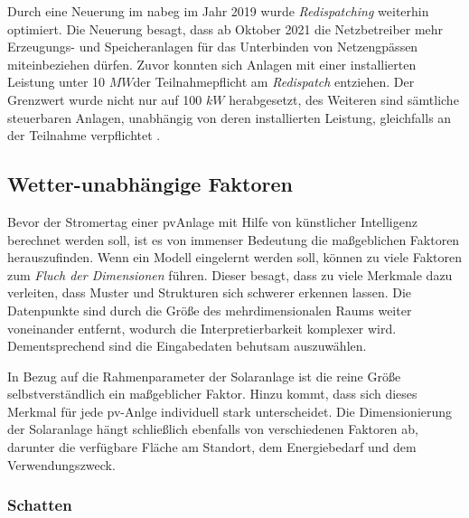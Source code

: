 \documentclass[12pt, a4paper]{article}
\begin{document}
Durch eine Neuerung im \ac{nabeg}  im Jahr 2019 wurde \textit{Redispatching} weiterhin optimiert. Die Neuerung besagt, dass ab Oktober 2021 die Netzbetreiber mehr Erzeugungs- und Speicheranlagen für das Unterbinden von Netzengpässen miteinbeziehen dürfen. Zuvor konnten sich Anlagen mit einer installierten Leistung unter 10 $MW$der Teilnahmepflicht am \textit{Redispatch} entziehen. Der Grenzwert wurde nicht nur auf 100 $kW$ herabgesetzt, des Weiteren sind sämtliche steuerbaren Anlagen, unabhängig von deren installierten Leistung, gleichfalls an der Teilnahme verpflichtet \cite{ws:bmwk}.




\subsection{Wetter-unabhängige Faktoren}

Bevor der Stromertag einer \ac{pv}Anlage mit Hilfe von künstlicher Intelligenz berechnet werden soll, ist es von immenser Bedeutung die maßgeblichen Faktoren herauszufinden. Wenn ein Modell eingelernt werden soll, können zu viele Faktoren zum \textit{Fluch der Dimensionen} führen. Dieser besagt, dass zu viele Merkmale dazu verleiten, dass Muster und Strukturen sich schwerer erkennen lassen. Die Datenpunkte sind durch die Größe des mehrdimensionalen Raums weiter voneinander entfernt, wodurch die Interpretierbarkeit komplexer wird. Dementsprechend sind die Eingabedaten behutsam auszuwählen.

In Bezug auf die Rahmenparameter der Solaranlage ist die reine Größe selbstverständlich ein maßgeblicher Faktor. Hinzu kommt, dass sich dieses Merkmal für jede \ac{pv}-Anlge individuell stark unterscheidet. Die Dimensionierung der Solaranlage hängt schließlich ebenfalls von verschiedenen Faktoren ab, darunter die verfügbare Fläche am Standort, dem Energiebedarf und dem Verwendungszweck.

\subsubsection{Schatten}
\end{document}

